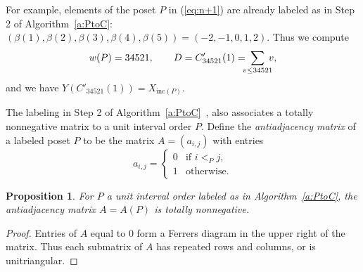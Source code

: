\documentclass[12pt]{amsart}
\newtheorem{prop}[thm]{Proposition}
\numberwithin{equation}{section}
\newcommand{\nTksp}{\negthickspace\negthickspace}
\newcommand{\inc}{\mathrm{inc}}
\begin{document}
For example, elements of the poset $P$ in (\ref{eq:n+1}) are already labeled
as in Step 2 of Algorithm~\ref{a:PtoC}:
  $(\beta(1), \beta(2), \beta(3), \beta(4), \beta(5)) = (-2, -1, 0, 1, 2)$.
Thus we compute
\begin{equation*}
  w(P) = 34521,
  \qquad D = C'_{34521}(1) = \nTksp \sum_{v \leq 34521} \nTksp v,
  \end{equation*}
and we have $Y(C'_{34521}(1)) = X_{\inc(P)}$.

The labeling in Step 2 of
Algorithm~\ref{a:PtoC}~\cite[p.\,33]{Fish}, \cite[\S 8.2]{Trott}
also associates a totally nonnegative matrix to a
unit interval order $P$.
Define the {\em antiadjacency matrix} of a labeled poset $P$ to be the matrix
$A = (a_{i,j})$ with entries
\begin{equation}\label{eq:antiadj}
  a_{i,j} = \begin{cases}
    0 &\text{if $i <_P j$},\\
    1 &\text{otherwise}.
  \end{cases}
\end{equation}
\begin{prop}
  For $P$ a unit interval order labeled as in
  Algorithm~\ref{a:PtoC},
  the antiadjacency matrix $A = A(P)$ is totally nonnegative.
\end{prop}
\begin{proof}
  Entries of $A$ equal to $0$ form a Ferrers diagram in the upper right
  of the matrix.  Thus each submatrix of $A$
  has repeated rows and columns, or is unitriangular.
\end{proof}
\end{document}
